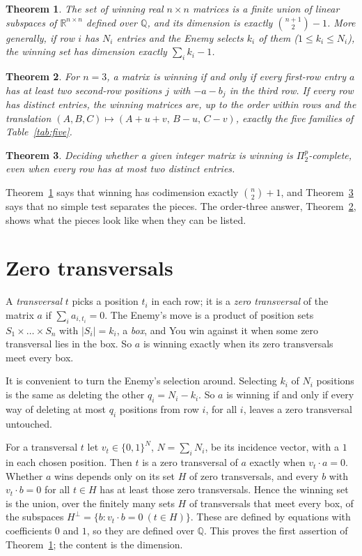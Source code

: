 \documentclass[11pt]{article}
\newtheorem{theorem}{Theorem}
\theoremstyle{definition}
\theoremstyle{remark}
\newcommand{\R}{\mathbb{R}}
\newcommand{\Q}{\mathbb{Q}}
\begin{document}
\begin{theorem}\label{thm:dim}
The set of winning real $n\times n$ matrices is a finite union of linear subspaces of $\R^{n\times n}$ defined over $\Q$, and its dimension is exactly $\binom{n+1}2-1$. More generally, if row $i$ has $N_i$ entries and the Enemy selects $k_i$ of them ($1\le k_i\le N_i$), the winning set has dimension exactly $\sum_ik_i-1$.
\end{theorem}

\begin{theorem}\label{thm:three}
For $n=3$, a matrix is winning if and only if every first-row entry $a$ has at least two second-row positions $j$ with $-a-b_j$ in the third row. If every row has distinct entries, the winning matrices are, up to the order within rows and the translation $(A,B,C)\mapsto(A+u+v,\,B-u,\,C-v)$, exactly the five families of Table~\ref{tab:five}.
\end{theorem}

\begin{theorem}\label{thm:hard}
Deciding whether a given integer matrix is winning is $\Pi_2^p$-complete, even when every row has at most two distinct entries.
\end{theorem}

Theorem~\ref{thm:dim} says that winning has codimension exactly $\binom n2+1$, and Theorem~\ref{thm:hard} says that no simple test separates the pieces. The order-three answer, Theorem~\ref{thm:three}, shows what the pieces look like when they can be listed.

\section{Zero transversals}

A \emph{transversal} $t$ picks a position $t_i$ in each row; it is a \emph{zero transversal} of the matrix $a$ if $\sum_i a_{i,t_i}=0$. The Enemy's move is a product of position sets $S_1\times\dots\times S_n$ with $|S_i|=k_i$, a \emph{box}, and You win against it when some zero transversal lies in the box. So $a$ is winning exactly when its zero transversals meet every box.

It is convenient to turn the Enemy's selection around. Selecting $k_i$ of $N_i$ positions is the same as deleting the other $q_i=N_i-k_i$. So $a$ is winning if and only if every way of deleting at most $q_i$ positions from row $i$, for all $i$, leaves a zero transversal untouched.

For a transversal $t$ let $v_t\in\{0,1\}^{N}$, $N=\sum_iN_i$, be its incidence vector, with a $1$ in each chosen position. Then $t$ is a zero transversal of $a$ exactly when $v_t\cdot a=0$. Whether $a$ wins depends only on its set $H$ of zero transversals, and every $b$ with $v_t\cdot b=0$ for all $t\in H$ has at least those zero transversals. Hence the winning set is the union, over the finitely many sets $H$ of transversals that meet every box, of the subspaces $H^\perp=\{b: v_t\cdot b=0\ (t\in H)\}$. These are defined by equations with coefficients $0$ and $1$, so they are defined over $\Q$. This proves the first assertion of Theorem~\ref{thm:dim}; the content is the dimension.
\end{document}
